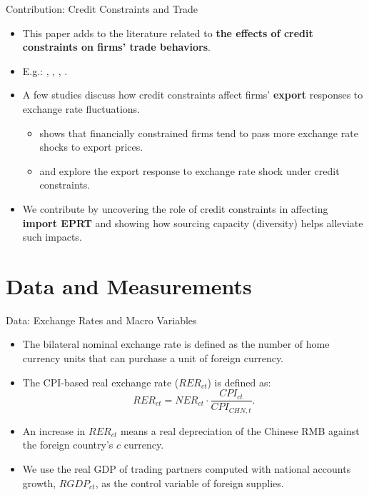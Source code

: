 \documentclass[10pt]{beamer}
\begin{document}
\begin{frame}{Contribution: Credit Constraints and Trade}
    \begin{itemize}
	\item This paper adds to the literature related to \textbf{the effects of credit constraints on firms' trade behaviors}.
        \medskip
        \item E.g.: \cite{manova2013}, \cite{chaney2016}, \cite{manova-wei-zhang2015}, \cite{fan-lai-li2015}.
        \item A few studies discuss how credit constraints affect firms' \textbf{export} responses to exchange rate fluctuations.
        \begin{itemize}
            \item \cite{strasser2013} shows that financially constrained firms tend to pass more exchange rate shocks to export prices.
		\item \cite{dai2021} and \cite{xu-guo2021} explore the export response to exchange rate shock under credit constraints. 
        \end{itemize}
        \medskip
    \item We contribute by uncovering the role of credit constraints in affecting \textbf{import EPRT} and showing how sourcing capacity (diversity) helps alleviate such impacts. 
    \end{itemize}	
\end{frame}

\section{Data and Measurements}

\begin{frame}{Data: Exchange Rates and Macro Variables}
	\begin{itemize}
		\item The bilateral nominal exchange rate is defined as the number of home currency units that can purchase a unit of foreign currency.
		\item The CPI-based real exchange rate ($RER_{ct}$) is defined as:
		$$
		RER_{ct}=NER_{ct} \cdot \frac{CPI_{ct}}{CPI_{CHN,t}}.
		$$
		\item An increase in $RER_{ct}$ means a real depreciation of the Chinese RMB against the
		foreign country’s $c$ currency.
		\item We use the real GDP of trading partners computed with national accounts growth, $RGDP_{ct}$, as the control variable of foreign supplies.
	\end{itemize}
\end{frame}
\end{document}
